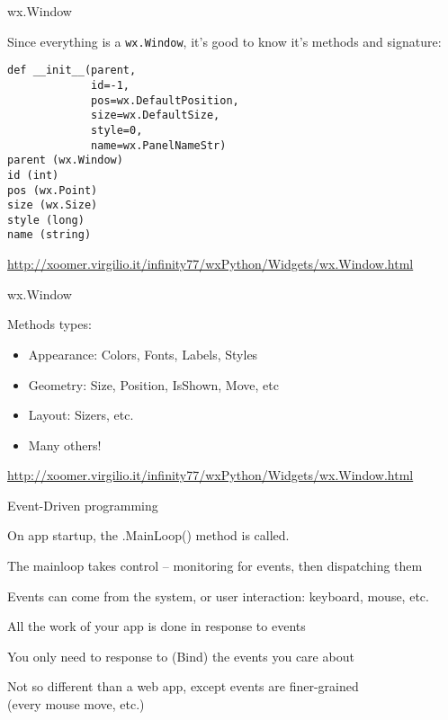 \documentclass{beamer}
\begin{document}
\begin{frame}[fragile]{wx.Window}

\vfill
{\Large Since everything is a \verb`wx.Window`, it's good to know it's methods and signature:}
\begin{verbatim}
def __init__(parent,
             id=-1,
             pos=wx.DefaultPosition,
             size=wx.DefaultSize,
             style=0,
             name=wx.PanelNameStr)
parent (wx.Window)
id (int)
pos (wx.Point)
size (wx.Size)
style (long)
name (string)
\end{verbatim}

\vfill
\url{http://xoomer.virgilio.it/infinity77/wxPython/Widgets/wx.Window.html}

\end{frame}



\begin{frame}[fragile]{wx.Window}

\vfill
{\Large Methods types:}
\begin{itemize}
  \item Appearance: Colors, Fonts, Labels, Styles
  \item Geometry: Size, Position, IsShown, Move, etc 
  \item Layout: Sizers, etc.
  \item Many others!
\end{itemize}

\vfill
\url{http://xoomer.virgilio.it/infinity77/wxPython/Widgets/wx.Window.html}

\end{frame}

\begin{frame}[fragile]{Event-Driven programming}

\vfill
{\Large On app startup, the .MainLoop() method is called.}

\vfill
{\Large The mainloop takes control -- monitoring for events, then dispatching them}

\vfill
{\Large Events can come from the system, or user interaction: keyboard, mouse, etc.}

\vfill
{\Large All the work of your app is done in response to events}

\vfill
{\Large You only need to response to (Bind) the events you care about}

\vfill
{\Large Not so different than a web app, except events are finer-grained}\\
(every mouse move, etc.)


\end{frame}
\end{document}
